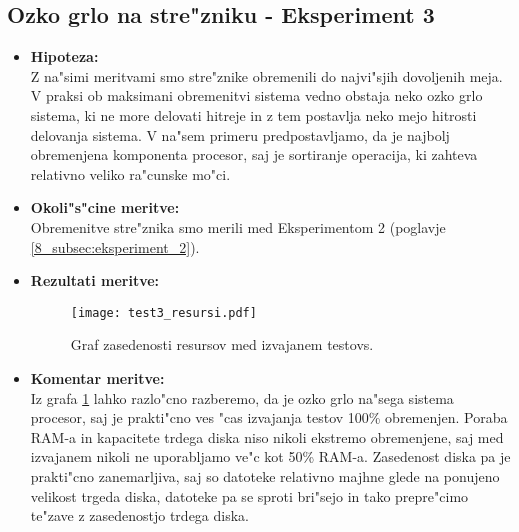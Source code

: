 \subsection{Ozko grlo na stre"zniku - Eksperiment 3}
\begin{itemize}
	\item \textbf{Hipoteza: }  \\
		Z na"simi meritvami smo stre"znike obremenili do najvi"sjih dovoljenih meja. V praksi ob maksimani obremenitvi sistema vedno obstaja neko ozko grlo sistema, ki ne more delovati hitreje in z tem postavlja neko mejo hitrosti delovanja sistema. V na"sem primeru predpostavljamo, da je najbolj obremenjena komponenta procesor, saj je sortiranje operacija, ki zahteva relativno veliko ra"cunske mo"ci. 
			
	\item \textbf{Okoli"s"cine meritve: } \\
		Obremenitve stre"znika smo merili med Eksperimentom 2 (poglavje \ref{8_subsec:eksperiment_2}). 

 	\item \textbf{Rezultati meritve: }  \\
		\begin{figure}[!htb]
  		\centering
  		  \texttt{[image: test3\_resursi.pdf]}
  		\caption{Graf zasedenosti resursov med izvajanem testovs.}
  		\label{8_graf_zasedenost_resursov}
		\end{figure}


	\item \textbf{Komentar meritve: } \\ 
		Iz grafa \ref{8_graf_zasedenost_resursov} lahko razlo"cno razberemo, da je ozko grlo na"sega sistema procesor, saj je prakti"cno ves "cas izvajanja testov 100\% obremenjen. Poraba RAM-a in kapacitete trdega diska niso nikoli ekstremo obremenjene, saj med izvajanem nikoli ne uporabljamo ve"c kot 50\% RAM-a. Zasedenost diska pa je prakti"cno zanemarljiva, saj so datoteke relativno majhne glede na ponujeno velikost trgeda diska, datoteke pa se sproti bri"sejo in tako prepre"cimo te"zave z zasedenostjo trdega diska. 


\end{itemize}

